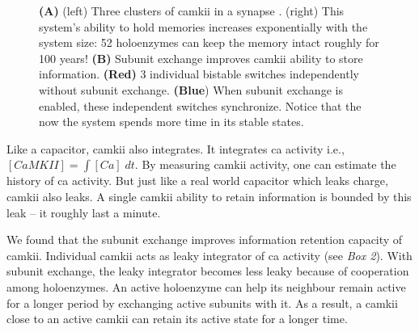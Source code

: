\documentclass[]{resonance}
\begin{document}
\begin{figure}[]
    \centering
    \caption{ \textbf{(A)} (left) Three clusters of \gls{camkii} in a synapse
        . (right) This system's ability to hold memories increases exponentially
        with the system size: 52 holoenzymes can keep the memory intact roughly for
        100 years! \textbf{(B)} Subunit exchange improves \gls{camkii} ability
        to store information. \textbf{(Red)} 3 individual bistable switches independently  
        without subunit exchange. \textbf{(Blue}) When subunit exchange is enabled, these 
        independent switches synchronize. Notice that the now the system spends more 
        time in its stable states.
    }\label{fig:camkii_sync}
    \vspace{3mm}
\end{figure}

Like a capacitor, \gls{camkii} also integrates. It integrates \gls{ca} activity
i.e., $[CaMKII]=\int [Ca]\; dt$.  By measuring \gls{camkii} activity, one can
estimate the history of \gls{ca} activity. But just like a real world capacitor
which leaks charge, \gls{camkii} also leaks. A single \gls{camkii} ability to
retain information is bounded by this leak -- it roughly last a minute.

We found that the subunit exchange improves information retention capacity of
\gls{camkii}. Individual \gls{camkii} acts as leaky integrator of \gls{ca}
activity (see \textit{Box 2}). With subunit exchange, the leaky integrator
becomes less leaky because of cooperation among holoenzymes. An active
holoenzyme can help its neighbour remain active for a longer period by
exchanging active subunits with it. As a result, a \gls{camkii} close to an
active \gls{camkii} can retain its active state for a longer time.
\end{document}
